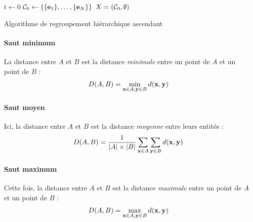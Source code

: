 \begin{algorithm}
$t \leftarrow  0$ \;
$\cal{C}_0 \leftarrow  \left\{ \{\bf{e}_1\}, \ldots, \{\bf{e}_N\} \right\}$\;
$X = (\cal{C}_0, \emptyset)$ \;

\caption{Algorithme de regroupement hiérarchique ascendant}
\end{algorithm}

\paragraph{Saut minimum}

La distance entre $A$ et $B$ est la distance \textit{minimale} entre un point de $A$ et un point de $B$ :
\begin{equation}
    D(A, B) = \min_{\bf{x} \in A, \bf{y} \in B} d(\bf{x}, \bf{y})
\end{equation}

\paragraph{Saut moyen}

Ici, la distance entre $A$ et $B$ est la distance \textit{moyenne} entre leurs entités :
\begin{equation}
    D(A, B) = \frac{1}{|A| \times |B|} \sum_{\bf{x} \in A} \sum_{\bf{y} \in B} d(\bf{x}, \bf{y})
\end{equation}

\paragraph{Saut maximum}

Cette fois, la distance entre $A$ et $B$ est la distance \textit{maximale} entre un point de $A$ et un point de $B$ :
\begin{equation}
    D(A, B) = \max_{\bf{x} \in A, \bf{y} \in B} d(\bf{x}, \bf{y})
\end{equation}

